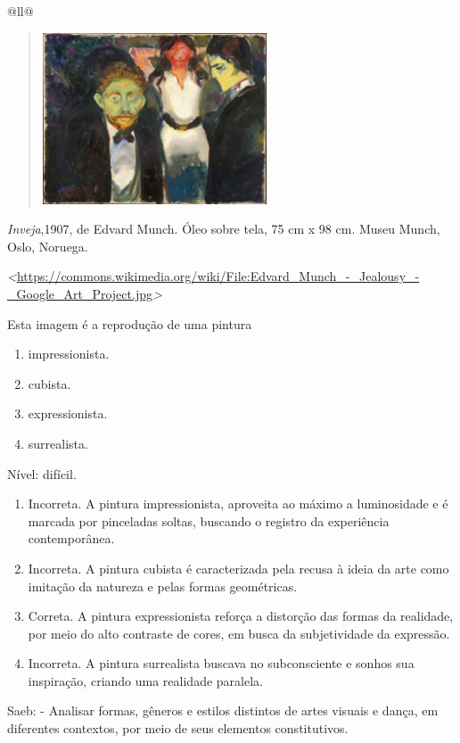 \begin{itemize}
\begin{itemize}
\begin{escolha}[]{@{}ll@{}}
{{{{{{{{\begin{quote}
\includegraphics[width=2.62500in,height=2.00000in]{media/image27.jpeg}
\end{quote}

\emph{Inveja},1907, de Edvard Munch. Óleo sobre tela, 75 cm x 98 cm.
Museu Munch, Oslo, Noruega.

\emph{\textless{}}\url{https://commons.wikimedia.org/wiki/File:Edvard_Munch_-_Jealousy_-_Google_Art_Project.jpg}\emph{\textgreater{}}

Esta imagem é a reprodução de uma pintura

\begin{enumerate}
\def\labelenumi{\alph{enumi})}
\item
  impressionista.
\item
  cubista.
\item
  expressionista.
\item
  surrealista.
\end{enumerate}

Nível: difícil.

\begin{enumerate}
\def\labelenumi{\alph{enumi})}
\item
  Incorreta. A pintura impressionista, aproveita ao máximo a
  luminosidade e é marcada por pinceladas soltas, buscando o registro da
  experiência contemporânea.
\item
  Incorreta. A pintura cubista é caracterizada pela recusa à ideia da
  arte como imitação da natureza e pelas formas geométricas.
\item
  Correta. A pintura expressionista reforça a distorção das formas da
  realidade, por meio do alto contraste de cores, em busca da
  subjetividade da expressão.
\item
  Incorreta. A pintura surrealista buscava no subconsciente e sonhos sua
  inspiração, criando uma realidade paralela.
\end{enumerate}

Saeb: - Analisar formas, gêneros e estilos distintos de artes visuais e
dança, em diferentes contextos, por meio de seus elementos
constitutivos.

}}}}}}}}
\end{escolha}
\end{itemize}
\end{itemize}
